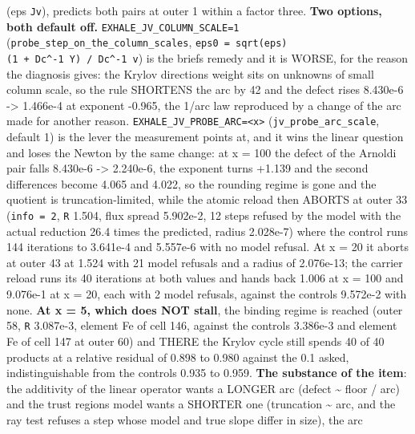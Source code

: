 \documentclass[english,a4paper]{my_memo}
\begin{document}
\begin{itemize}
  (eps \texttt{\textbar{}\textbar{}Jv\textbar{}\textbar{}}), predicts both pairs at outer 1 within a factor three.
  \textbf{Two options, both default off.} \texttt{EXHALE\_JV\_COLUMN\_SCALE=1}
  (\texttt{probe\_step\_on\_the\_column\_scales}, \texttt{eps0\ =\ sqrt(eps)(1\ +\ \textbar{}\textbar{}Dc\^{}-1\ Y\textbar{}\textbar{})\ /\ \textbar{}\textbar{}Dc\^{}-1\ v\textbar{}\textbar{}}) is the brief\textquotesingle s remedy and it is WORSE, for the reason the
  diagnosis gives: the Krylov direction\textquotesingle s weight sits on unknowns of small
  column scale, so the rule SHORTENS the arc by 42 and the defect rises
  8.430e-6 -\textgreater{} 1.466e-4 at exponent -0.965, the 1/arc law reproduced by a
  change of the arc made for another reason. \texttt{EXHALE\_JV\_PROBE\_ARC=\textless{}x\textgreater{}}
  (\texttt{jv\_probe\_arc\_scale}, default 1) is the lever the measurement points at,
  and it wins the linear question and loses the Newton by the same change:
  at x = 100 the defect of the Arnoldi pair falls 8.430e-6 -\textgreater{} 2.240e-6, the
  exponent turns +1.139 and the second differences become 4.065 and 4.022,
  so the rounding regime is gone and the quotient is truncation-limited,
  while the atomic reload then ABORTS at outer 33 (\texttt{info\ =\ 2}, \texttt{\textbar{}\textbar{}R\textbar{}\textbar{}}
  1.504, flux spread 5.902e-2, 12 steps refused by the model with the
  actual reduction 26.4 times the predicted, radius 2.028e-7) where the
  control runs 144 iterations to 3.641e-4 and 5.557e-6 with no model
  refusal. At x = 20 it aborts at outer 43 at 1.524 with 21 model
  refusals and a radius of 2.076e-13; the carrier reload runs its 40
  iterations at both values and hands back 1.006 at x = 100 and 9.076e-1
  at x = 20, each with 2 model refusals, against the control\textquotesingle s 9.572e-2
  with none. \textbf{At x = 5, which
  does NOT stall}, the binding regime is reached (outer 58, \texttt{\textbar{}\textbar{}R\textbar{}\textbar{}}
  3.087e-3, element Fe of cell 146, against the control\textquotesingle s 3.386e-3 and
  element Fe of cell 147 at outer 60) and THERE the Krylov cycle still
  spends 40 of 40 products at a relative residual of 0.898 to 0.980
  against the 0.1 asked, indistinguishable from the control\textquotesingle s 0.935 to
  0.959. \textbf{The substance of the item}: the additivity of the linear
  operator wants a LONGER arc (defect \textasciitilde{} floor / arc) and the trust
  region\textquotesingle s model wants a SHORTER one (truncation \textasciitilde{} arc, and the ray test
  refuses a step whose model and true slope differ in size), the arc

\end{itemize}
\end{document}
